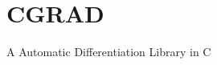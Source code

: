 \chapter{CGRAD}
\hypertarget{md__2_users_2eugenebaek_2_documents_2cgrad_2_r_e_a_d_m_e}{}\label{md__2_users_2eugenebaek_2_documents_2cgrad_2_r_e_a_d_m_e}
\label{md__2_users_2eugenebaek_2_documents_2cgrad_2_r_e_a_d_m_e_autotoc_md0}%
%
A Automatic Differentiation Library in C 